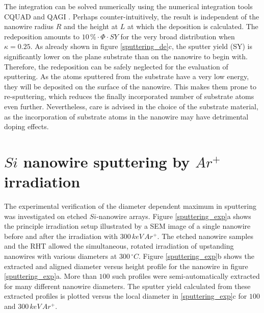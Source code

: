 The integration can be solved numerically using the numerical integration tools CQUAD and QAGI \cite{gough_gnu_2009}. Perhaps counter-intuitively, the result is independent of the nanowire radius $R$ and the height at $L$ at which the deposition is calculated. The redeposition amounts to $10\,\% \cdot \Phi\cdot SY$ for the very broad distribution when $\kappa = 0.25$. As already shown in figure \ref{sputtering_de}c, the sputter yield (SY) is significantly lower on the plane substrate than on the nanowire to begin with. Therefore, the redeposition can be safely neglected for the evaluation of sputtering. As the atoms sputtered from the substrate have a very low energy, they will be deposited on the surface of the nanowire. This makes them prone to re-sputtering, which reduces the finally incorporated number of substrate atoms even further. Nevertheless, care is advised in the choice of the substrate material, as the incorporation of substrate atoms in the nanowire may have detrimental doping effects.







\section{$Si$ nanowire sputtering by $Ar^+$ irradiation}
\label{sec:sisputtering}

The experimental verification of the diameter dependent maximum in sputtering was investigated on etched $Si$-nanowire arrays. Figure \ref{sputtering_exp}a shows the principle irradiation setup illustrated by a SEM image of a single nanowire before and after the irradiation with $300\,keV\,Ar^+$. The etched nanowire samples and the RHT allowed the simultaneous, rotated irradiation of upstanding nanowires with various diameters at $300\,^\circ C$. Figure \ref{sputtering_exp}b shows the extracted and aligned diameter versus height profile for the nanowire in figure \ref{sputtering_exp}a. More than $100$ such profiles were semi-automatically extracted for many different nanowire diameters. The sputter yield calculated from these extracted profiles is plotted versus the local diameter in \ref{sputtering_exp}c for $100$ and $300\,keV\,Ar^+$.

